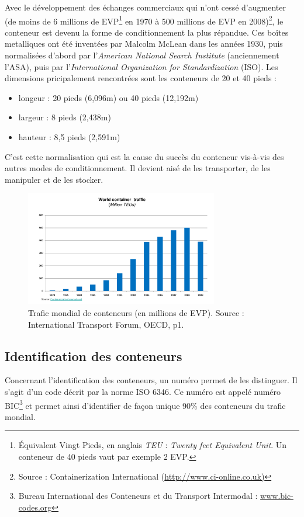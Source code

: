 
Avec le développement des échanges commerciaux qui n'ont cessé d'augmenter (de moins de 6 millions de EVP\footnote{Équivalent Vingt Pieds, en anglais \textit{TEU} : \textit{Twenty feet Equivalent Unit}. Un conteneur de 40 pieds vaut par exemple 2 EVP.} en 1970 à 500 millions de EVP en 2008)\footnote{Source : Containerization International (\url{http://www.ci-online.co.uk)}}, le conteneur est devenu la forme de conditionnement la plus répandue. Ces boîtes metalliques ont été inventées par Malcolm McLean dans les années 1930, puis normalisées d'abord par l'\textit{American National Search Institute} (anciennement l'ASA), puis par l'\textit{International Organization for Standardization} (ISO). Les dimensions pricipalement rencontrées sont les conteneurs de 20 et 40 pieds :
\begin{itemize}
 \item longeur : 20 pieds (6,096m) ou 40 pieds (12,192m)
 \item largeur : 8 pieds (2,438m)
 \item hauteur : 8,5 pieds (2,591m)
\end{itemize}
C'est cette normalisation qui est la cause du succès du conteneur vis-à-vis des autres modes de conditionnement. Il devient aisé de les transporter, de les manipuler et de les stocker.

\begin{figure}
 \label{fig:worldContainerTraffic}
 \begin{center}
 \includegraphics[width=0.75\textwidth]{chapitres/application/worldContainerTraffic.png}
 \caption{Trafic mondial de conteneurs (en millions de EVP). Source : International Transport Forum, OECD, p1.}
 \end{center}
\end{figure}

\subsection*{Identification des conteneurs}
Concernant l'identification des conteneurs, un numéro permet de les distinguer. Il s'agit d'un code décrit par la norme ISO 6346. Ce numéro est appelé numéro BIC\footnote{Bureau International des Conteneurs et du Transport Intermodal : \url{www.bic-codes.org}} et permet ainsi d'identifier de façon unique 90\% des conteneurs du trafic mondial.

